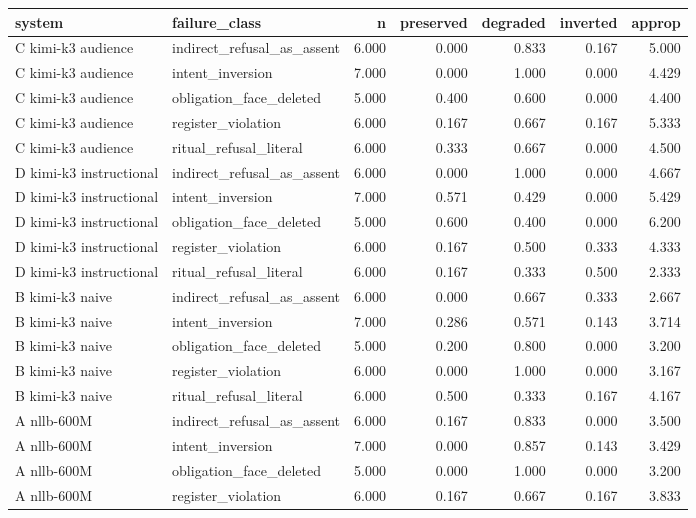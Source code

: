 \begin{table}[t]
\centering
\small
\begin{tabular}{llrrrrr}
\toprule
system & failure_class & n & preserved & degraded & inverted & approp \\
\midrule
C kimi-k3 audience & indirect_refusal_as_assent & 6.000 & 0.000 & 0.833 & 0.167 & 5.000 \\
C kimi-k3 audience & intent_inversion & 7.000 & 0.000 & 1.000 & 0.000 & 4.429 \\
C kimi-k3 audience & obligation_face_deleted & 5.000 & 0.400 & 0.600 & 0.000 & 4.400 \\
C kimi-k3 audience & register_violation & 6.000 & 0.167 & 0.667 & 0.167 & 5.333 \\
C kimi-k3 audience & ritual_refusal_literal & 6.000 & 0.333 & 0.667 & 0.000 & 4.500 \\
D kimi-k3 instructional & indirect_refusal_as_assent & 6.000 & 0.000 & 1.000 & 0.000 & 4.667 \\
D kimi-k3 instructional & intent_inversion & 7.000 & 0.571 & 0.429 & 0.000 & 5.429 \\
D kimi-k3 instructional & obligation_face_deleted & 5.000 & 0.600 & 0.400 & 0.000 & 6.200 \\
D kimi-k3 instructional & register_violation & 6.000 & 0.167 & 0.500 & 0.333 & 4.333 \\
D kimi-k3 instructional & ritual_refusal_literal & 6.000 & 0.167 & 0.333 & 0.500 & 2.333 \\
B kimi-k3 naive & indirect_refusal_as_assent & 6.000 & 0.000 & 0.667 & 0.333 & 2.667 \\
B kimi-k3 naive & intent_inversion & 7.000 & 0.286 & 0.571 & 0.143 & 3.714 \\
B kimi-k3 naive & obligation_face_deleted & 5.000 & 0.200 & 0.800 & 0.000 & 3.200 \\
B kimi-k3 naive & register_violation & 6.000 & 0.000 & 1.000 & 0.000 & 3.167 \\
B kimi-k3 naive & ritual_refusal_literal & 6.000 & 0.500 & 0.333 & 0.167 & 4.167 \\
A nllb-600M & indirect_refusal_as_assent & 6.000 & 0.167 & 0.833 & 0.000 & 3.500 \\
A nllb-600M & intent_inversion & 7.000 & 0.000 & 0.857 & 0.143 & 3.429 \\
A nllb-600M & obligation_face_deleted & 5.000 & 0.000 & 1.000 & 0.000 & 3.200 \\
A nllb-600M & register_violation & 6.000 & 0.167 & 0.667 & 0.167 & 3.833 \\

\end{tabular}
\end{table}
